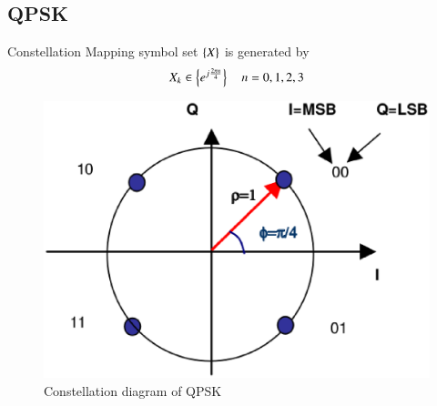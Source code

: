 \documentclass[journal,12pt,twocolumn]{IEEEtran}
\begin{document}
\subsection{QPSK}
Constellation Mapping symbol set $\left\{X\right\}$ is generated by
\begin{equation}
X_k \in \left\{e^{j \frac{2\pi n}{4}}\right\} \quad n=0,1,2,3
\end{equation}
%
\begin{figure}[!ht]
\begin{center}
\includegraphics[width=\columnwidth]{./figs/qpsk}
\end{center}
\caption{Constellation diagram of QPSK}
\label{fig:qpsk}
\end{figure}




\end{document}

